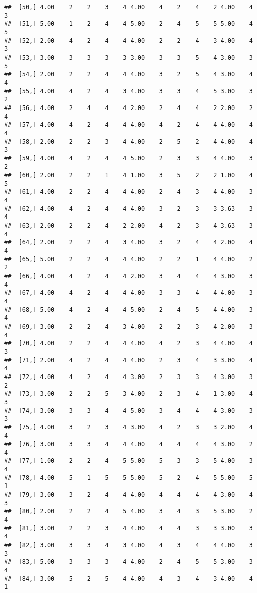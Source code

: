 \documentclass[]{article}
\begin{document}
\begin{verbatim}
##  [50,] 4.00    2    2    3    4 4.00    4    2    4    2 4.00    4    3
##  [51,] 5.00    1    2    4    4 5.00    2    4    5    5 5.00    4    5
##  [52,] 2.00    4    2    4    4 4.00    2    2    4    3 4.00    4    3
##  [53,] 3.00    3    3    3    3 3.00    3    3    5    4 3.00    3    5
##  [54,] 2.00    2    2    4    4 4.00    3    2    5    4 3.00    4    4
##  [55,] 4.00    4    2    4    3 4.00    3    3    4    5 3.00    3    2
##  [56,] 4.00    2    4    4    4 2.00    2    4    4    2 2.00    2    4
##  [57,] 4.00    4    2    4    4 4.00    4    2    4    4 4.00    4    4
##  [58,] 2.00    2    2    3    4 4.00    2    5    2    4 4.00    4    3
##  [59,] 4.00    4    2    4    4 5.00    2    3    3    4 4.00    3    2
##  [60,] 2.00    2    2    1    4 1.00    3    5    2    2 1.00    4    5
##  [61,] 4.00    2    2    4    4 4.00    2    4    3    4 4.00    3    4
##  [62,] 4.00    4    2    4    4 4.00    3    2    3    3 3.63    3    4
##  [63,] 2.00    2    2    4    2 2.00    4    2    3    4 3.63    3    4
##  [64,] 2.00    2    2    4    3 4.00    3    2    4    4 2.00    4    4
##  [65,] 5.00    2    2    4    4 4.00    2    2    1    4 4.00    2    2
##  [66,] 4.00    4    2    4    4 2.00    3    4    4    4 3.00    3    4
##  [67,] 4.00    4    2    4    4 4.00    3    3    4    4 4.00    3    4
##  [68,] 5.00    4    2    4    4 5.00    2    4    5    4 4.00    3    4
##  [69,] 3.00    2    2    4    3 4.00    2    2    3    4 2.00    3    4
##  [70,] 4.00    2    2    4    4 4.00    4    2    3    4 4.00    4    3
##  [71,] 2.00    4    2    4    4 4.00    2    3    4    3 3.00    4    4
##  [72,] 4.00    4    2    4    4 3.00    2    3    3    4 3.00    3    2
##  [73,] 3.00    2    2    5    3 4.00    2    3    4    1 3.00    4    3
##  [74,] 3.00    3    3    4    4 5.00    3    4    4    4 3.00    3    3
##  [75,] 4.00    3    2    3    4 3.00    4    2    3    3 2.00    4    4
##  [76,] 3.00    3    3    4    4 4.00    4    4    4    4 3.00    2    4
##  [77,] 1.00    2    2    4    5 5.00    5    3    3    5 4.00    3    4
##  [78,] 4.00    5    1    5    5 5.00    5    2    4    5 5.00    5    1
##  [79,] 3.00    3    2    4    4 4.00    4    4    4    4 3.00    4    3
##  [80,] 2.00    2    2    4    5 4.00    3    4    3    5 3.00    2    4
##  [81,] 3.00    2    2    3    4 4.00    4    4    3    3 3.00    3    4
##  [82,] 3.00    3    3    4    3 4.00    4    3    4    4 4.00    3    3
##  [83,] 5.00    3    3    3    4 4.00    2    4    5    5 3.00    3    4
##  [84,] 3.00    5    2    5    4 4.00    4    3    4    3 4.00    4    1

\end{verbatim}
\end{document}
